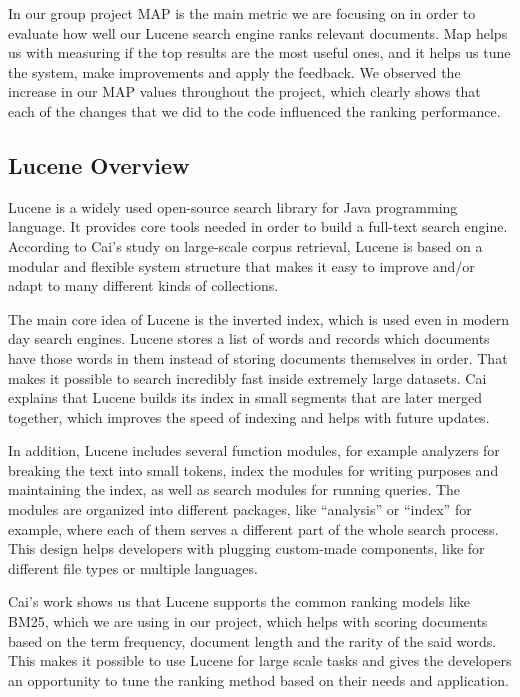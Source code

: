 \documentclass[sigplan,screen,nonacm]{acmart}
\begin{document}
In our group project MAP is the main metric we are focusing on in order to evaluate how well our Lucene search engine ranks relevant documents. Map helps us with measuring if the top results are the most useful ones, and it helps us tune the system, make improvements and apply the feedback. We observed the increase in our MAP values throughout the project, which clearly shows that each of the changes that we did to the code influenced the ranking performance.

\subsection{Lucene Overview}
Lucene is a widely used open-source search library for Java programming language. It provides core tools needed in order to build a full-text search engine. According to Cai’s study on large-scale corpus retrieval, Lucene is based on a modular and flexible system structure that makes it easy to improve and/or adapt to many different kinds of collections\cite{Cai24}.

The main core idea of Lucene is the inverted index, which is used even in modern day search engines. Lucene stores a list of words and records which documents have those words in them instead of storing documents themselves in order.  That makes it possible to search incredibly fast inside extremely large datasets. Cai explains that Lucene builds its index in small segments that are later merged together, which improves the speed of indexing and helps with future updates\cite{Cai24}. 

In addition, Lucene includes several function modules, for example analyzers for breaking the text into small tokens, index the modules for writing purposes and maintaining the index, as well as search modules for running queries. The modules are organized into different packages, like “analysis” or “index” for example, where each of them serves a different part of the whole search process. This design helps developers with plugging custom-made components, like for different file types or multiple languages.

Cai’s work shows us that Lucene supports the common ranking models like BM25, which we are using in our project, which helps with scoring documents based on the term frequency, document length and the rarity of the said words\cite{Cai24}. This makes it possible to use Lucene for large  scale tasks and gives the developers an opportunity to tune the ranking method based on their needs and application.
\end{document}
